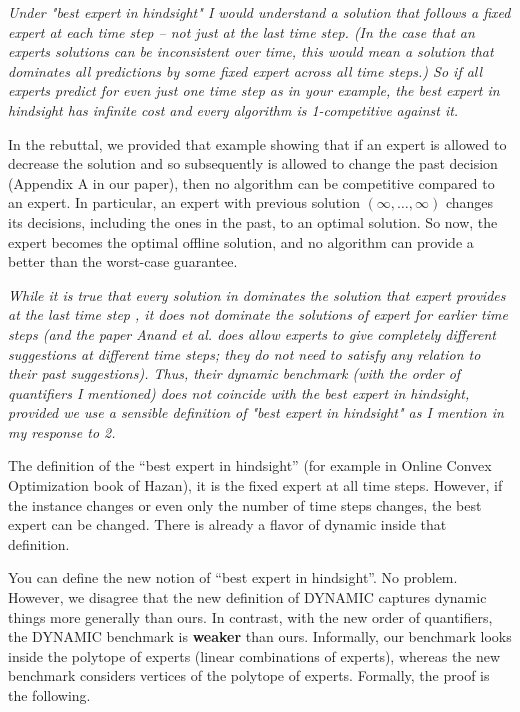 \documentclass[12pt]{article}
\begin{document}
\textit{\color{red} Under "best expert in hindsight" I would understand a solution that follows a fixed expert at each time step -- not just at the last time step. (In the case that an experts solutions can be inconsistent over time, this would mean a solution that dominates all predictions by some fixed expert across all time steps.) So if all experts predict 
 for even just one time step as in your example, the best expert in hindsight has infinite cost and every algorithm is 1-competitive against it.}

In the rebuttal, we provided that example showing that if an expert is allowed to decrease the solution and so subsequently is allowed to change the past decision (Appendix A in our paper), then no algorithm can be competitive compared to an expert. In particular, an expert with previous solution $(\infty, \ldots, \infty)$ changes its decisions, including the ones in the past, to an optimal solution. So now, the expert becomes the optimal offline solution, and no algorithm can provide a better than the worst-case guarantee.   


\textit{\color{red}While it is true that every solution in 
 dominates the solution that expert 
 provides at the last time step 
, it does not dominate the solutions of expert 
 for earlier time steps (and the paper Anand et al. does allow experts to give completely different suggestions at different time steps; they do not need to satisfy any relation to their past suggestions). Thus, their dynamic benchmark (with the order of quantifiers I mentioned) does not coincide with the best expert in hindsight, provided we use a sensible definition of "best expert in hindsight" as I mention in my response to 2.}


The definition of the ``best expert in hindsight'' (for example in Online Convex Optimization book of Hazan), it is the fixed expert at all time steps. However, if the instance changes or even only the number of time steps changes, the best expert can be changed. There is already a flavor of dynamic inside that definition. 

You can define the new notion of ``best expert in hindsight''. No problem. However, we disagree that the new definition of DYNAMIC captures dynamic things more generally than ours. In contrast, with the new order of quantifiers, the DYNAMIC benchmark is \textbf{weaker} than ours. Informally, our benchmark looks inside the polytope of experts (linear combinations of experts), whereas the new benchmark considers vertices of the polytope of experts. Formally, the proof is the following.
\end{document}
